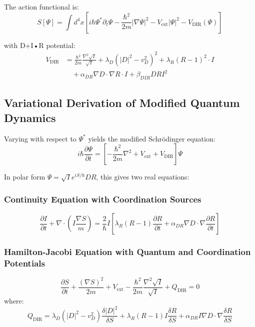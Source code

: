 \documentclass[11pt,a4paper]{article}
\begin{document}
	The action functional is:
	\begin{equation}
		S[\Psi] = \int d^4x \left[ i\hbar \Psi^* \partial_t \Psi - \frac{\hbar^2}{2m} |\nabla \Psi|^2 - V_{\text{ext}} |\Psi|^2 - V_{\text{DIR}}(\Psi) \right]
	\end{equation}
	
	with D+I•R potential:
	\begin{align}
		V_{\text{DIR}} &= \frac{\hbar^2}{2m} \frac{\nabla^2 \sqrt{I}}{\sqrt{I}} 
		+ \lambda_D (|D|^2 - v_D^2)^2 
		+ \lambda_R (R - 1)^2 \cdot I \\
		&\quad + \alpha_{DR} \nabla D \cdot \nabla R \cdot I 
		+ \beta_{DIR} D R I^2
	\end{align}
	
	\subsection{Variational Derivation of Modified Quantum Dynamics}
	
	Varying with respect to $\Psi^*$ yields the modified Schrödinger equation:
	\begin{equation}
		i\hbar \frac{\partial \Psi}{\partial t} = \left[ -\frac{\hbar^2}{2m} \nabla^2 + V_{\text{ext}} + V_{\text{DIR}} \right] \Psi
	\end{equation}
	
	In polar form $\Psi = \sqrt{I} e^{iS/\hbar} D R$, this gives two real equations:
	
	\subsubsection{Continuity Equation with Coordination Sources}
	\begin{equation}
		\frac{\partial I}{\partial t} + \nabla \cdot \left( I \frac{\nabla S}{m} \right) = \frac{2}{\hbar} I \left[ \lambda_R (R-1) \frac{\partial R}{\partial t} + \alpha_{DR} \nabla D \cdot \nabla \frac{\partial R}{\partial t} \right]
	\end{equation}
	
	\subsubsection{Hamilton-Jacobi Equation with Quantum and Coordination Potentials}
	\begin{equation}
		\frac{\partial S}{\partial t} + \frac{(\nabla S)^2}{2m} + V_{\text{ext}} - \frac{\hbar^2}{2m} \frac{\nabla^2 \sqrt{I}}{\sqrt{I}} + Q_{\text{DIR}} = 0
	\end{equation}
	where:
	\begin{equation}
		Q_{\text{DIR}} = \lambda_D (|D|^2 - v_D^2) \frac{\delta |D|^2}{\delta S} 
		+ \lambda_R (R-1) I \frac{\delta R}{\delta S}
		+ \alpha_{DR} I \nabla D \cdot \nabla \frac{\delta R}{\delta S}
	\end{equation}
	
\end{document}
